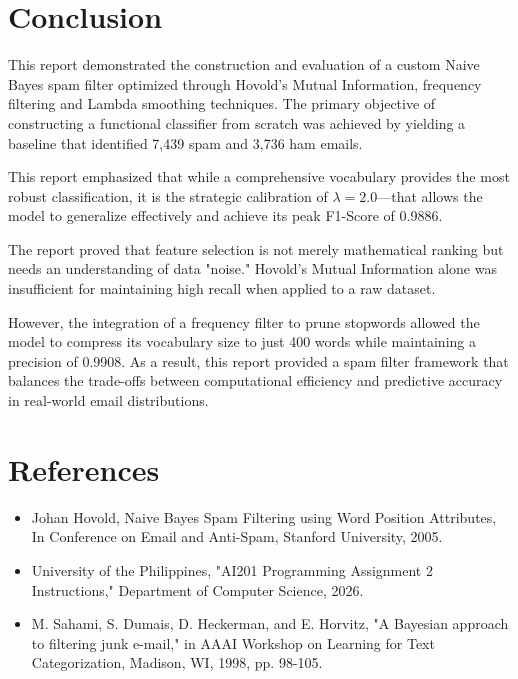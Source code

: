 \documentclass{acm_proc_article-sp}
\begin{document}
\section{Conclusion}
This report demonstrated the construction and evaluation of a custom Naive Bayes spam filter optimized through Hovold’s Mutual Information, frequency filtering and  Lambda smoothing techniques. The primary objective of constructing a functional classifier from scratch was achieved by yielding a baseline that identified 7,439 spam and 3,736 ham emails. 

This report emphasized that while a comprehensive vocabulary provides the most robust classification, it is the strategic calibration of  $\lambda=2.0$—that allows the model to generalize effectively and achieve its peak F1-Score of 0.9886.

The report proved that feature selection is not merely mathematical ranking but needs an understanding of data "noise." Hovold’s Mutual Information alone was insufficient for maintaining high recall when applied to a raw dataset. 

However, the integration of a frequency filter to prune stopwords allowed the model to compress its vocabulary size to just 400 words while maintaining a precision of 0.9908. As a result, this report provided a spam filter framework that balances the trade-offs between computational efficiency and predictive accuracy in real-world email distributions.

\section{References}
\begin{itemize}
    \item [1] Johan Hovold, Naive Bayes Spam Filtering using Word Position Attributes, In Conference on Email and Anti-Spam, Stanford University, 2005.
    \item [2] University of the Philippines, "AI201 Programming Assignment 2 Instructions," Department of Computer Science, 2026.
    \item [3] M. Sahami, S. Dumais, D. Heckerman, and E. Horvitz, "A Bayesian approach to filtering junk e-mail," in AAAI Workshop on Learning for Text Categorization, Madison, WI, 1998, pp. 98-105.
\end{itemize}
\end{document}
